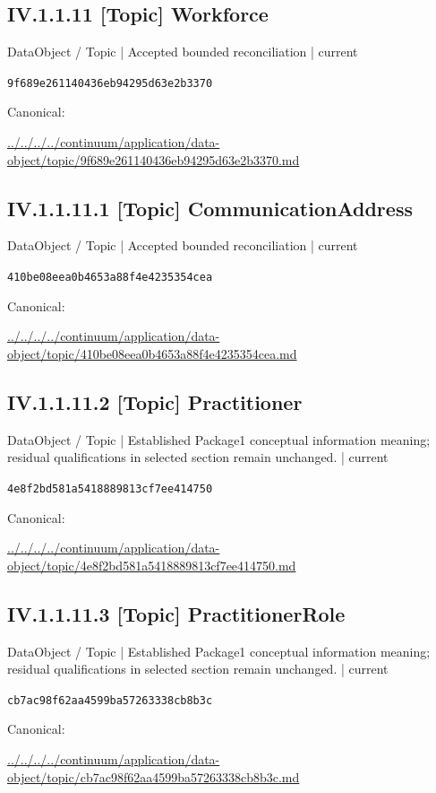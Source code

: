 \documentclass[10pt,a4paper]{article}
\begin{document}
\subsection*{IV.1.1.11 [Topic] Workforce}
\label{element-9f689e261140436eb94295d63e2b3370}
{\small DataObject / Topic | Accepted bounded reconciliation | current}\par
\texttt{9f689e261140436eb94295d63e2b3370}\par
Canonical: \par
{\footnotesize\url{../../../../continuum/application/data-object/topic/9f689e261140436eb94295d63e2b3370.md}}\par
\subsection*{IV.1.1.11.1 [Topic] CommunicationAddress}
\label{element-410be08eea0b4653a88f4e4235354cea}
{\small DataObject / Topic | Accepted bounded reconciliation | current}\par
\texttt{410be08eea0b4653a88f4e4235354cea}\par
Canonical: \par
{\footnotesize\url{../../../../continuum/application/data-object/topic/410be08eea0b4653a88f4e4235354cea.md}}\par
\subsection*{IV.1.1.11.2 [Topic] Practitioner}
\label{element-4e8f2bd581a5418889813cf7ee414750}
{\small DataObject / Topic | Established Package1 conceptual information meaning; residual qualifications in selected section remain unchanged. | current}\par
\texttt{4e8f2bd581a5418889813cf7ee414750}\par
Canonical: \par
{\footnotesize\url{../../../../continuum/application/data-object/topic/4e8f2bd581a5418889813cf7ee414750.md}}\par
\subsection*{IV.1.1.11.3 [Topic] PractitionerRole}
\label{element-cb7ac98f62aa4599ba57263338cb8b3c}
{\small DataObject / Topic | Established Package1 conceptual information meaning; residual qualifications in selected section remain unchanged. | current}\par
\texttt{cb7ac98f62aa4599ba57263338cb8b3c}\par
Canonical: \par
{\footnotesize\url{../../../../continuum/application/data-object/topic/cb7ac98f62aa4599ba57263338cb8b3c.md}}\par
\end{document}
